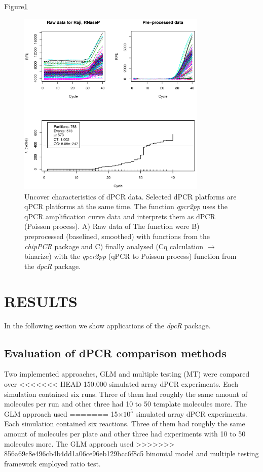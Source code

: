 \documentclass[a4,center,fleqn]{NAR}
\providecommand{\e}[1]{\ensuremath{\times 10^{#1}}}
\begin{document}
Figure\ref{qpcr2pp_1}

\begin{figure}[t]
\begin{center}
\includegraphics[width=9cm]{qpcr2pp_1.png}
\end{center}
\caption{Uncover characteristics of dPCR data. 
Selected dPCR platforms are qPCR platforms at the same time. The function \textit{qpcr2pp} uses the 
qPCR amplification curve data and interprets them as dPCR (Poisson process). A) Raw data of The 
function were B) preprocessed (baselined, smoothed) with functions from the 
\textit{chipPCR} package and C) finally analysed (Cq calculation $\rightarrow$ binarize) with the 
\textit{qpcr2pp} (qPCR to Poisson process) function from the \textit{dpcR} package.} 
\label{qpcr2pp_1}
\end{figure}

\section{RESULTS}

In the following section we show applications of the \textit{dpcR} package.

\subsection{Evaluation of dPCR comparison methods}

Two implemented approaches, GLM and multiple testing (MT) were compared over 
<<<<<<< HEAD
150.000 simulated array dPCR experiments. Each simulation contained six 
runs. Three of them had roughly the same amount of molecules per run and 
other three had 10 to 50 template molecules more. The GLM approach used 
=======
15\e{5} simulated array dPCR experiments. Each simulation contained six 
reactions. Three of them had roughly the same amount of molecules per plate and 
other three had experiments with 10 to 50 molecules more. The GLM approach used 
>>>>>>> 856a69c8e496cb4b4dd1a06ce96eb129bcc6f8c5
binomial model and multiple testing framework employed ratio test.
\end{document}
